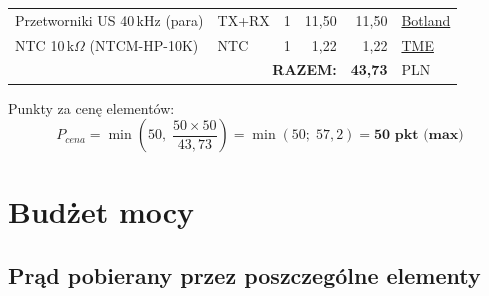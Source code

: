 \documentclass[a4paper,11pt]{article}
\begin{document}
\begin{table}[H]
\begin{tabularx}{\textwidth}{l l r r r X}
			Przetworniki US 40\,kHz (para) & TX+RX & 1 & 11,50 & 11,50 &
			\href{https://botland.com.pl/ultradzwiekowe-czujniki-odleglosci/1209-czujniki-ultradzwiekowe-16mm-komplet-5904422355920.html}{Botland} \\
			NTC 10\,k$\Omega$ (NTCM-HP-10K) & NTC & 1 & 1,22 & 1,22 &
			\href{https://www.tme.eu/pl/details/ntcm-hp-10k-1\%25/termistory-ntc-pomiarowe-tht/sr-passives/}{TME} \\
			\midrule
			\multicolumn{4}{r}{\textbf{RAZEM:}} & \textbf{43,73} & PLN \\
			\bottomrule
		\end{tabularx}
	\end{table}
	
	Punkty za cenę elementów:
	\begin{equation}
		P_{cena} = \min\!\left(50,\; \frac{50 \times 50}{43{,}73}\right)
		= \min(50;\; 57{,}2) = \textbf{50~pkt~(max)}
		\label{eq:pkt_cena}
	\end{equation}
	
	
	\section{Budżet mocy}
	\label{sec:moc}
	
	\subsection{Prąd pobierany przez poszczególne elementy}
	
\end{document}

